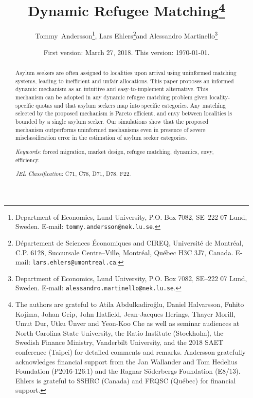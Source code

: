 \documentclass[12pt,fleqn]{article}
\begin{document}
\title{\textbf{Dynamic Refugee Matching}\footnote{The authors are grateful to Atila Abdulkadiro\u{g}lu, Daniel Halvarsson, Fuhito Kojima, Johan Grip, John Hatfield, Jean-Jacques Herings, Thayer Morill, Umut Dur, Utku \"{U}nver and Yeon-Koo Che as well as seminar audiences at North Carolina State University, the Ratio Institute (Stockholm), the Swedish Finance Ministry, Vanderbilt University, and the 2018 SAET conference (Taipei) for detailed comments and remarks. Andersson gratefully acknowledges financial support from the Jan Wallander and Tom Hedelius Foundation (P2016-126:1) and the Ragnar S\"oderbergs Foundation (E8/13). Ehlers is grateful to SSHRC (Canada) and FRQSC (Qu\'{e}bec) for financial support.}}

\author{Tommy~Andersson\footnote{Department of Economics, Lund University, P.O. Box 7082, SE--222 07 Lund, Sweden. E-mail: \texttt{tommy.andersson@nek.lu.se}.}, Lars Ehlers\footnote{D\'epartement de Sciences \'Economiques and CIREQ, Universit\'e de Montr\'eal, C.P. 6128, Succursale Centre--Ville, Montr\'eal, Qu\'ebec H3C
3J7, Canada. E-mail: \texttt{lars.ehlers@umontreal.ca}.}\space\space and Alessandro Martinello\footnote{Department of Economics, Lund University, P.O. Box 7082, SE--222 07 Lund, Sweden. E-mail: \texttt{alessandro.martinello@nek.lu.se}.}}

\date{\small{First version: March 27, 2018. This version: \today.}}

\maketitle
\vspace*{-4mm}
\begin{abstract}
\noindent Asylum seekers are often assigned to localities upon arrival using uninformed matching systems, leading to inefficient and unfair allocations. This paper proposes an informed dynamic mechanism as an intuitive and easy-to-implement alternative. This mechanism can be adopted in any dynamic refugee matching problem given locality-specific quotas and that asylum seekers map into specific categories. Any matching selected by the proposed mechanism is Pareto efficient, and envy between localities is bounded by a single asylum seeker. Our simulations show that the proposed mechanism outperforms uninformed mechanisms even in presence of severe misclassification error in the estimation of asylum seeker categories.

\medskip

\noindent\emph{Keywords}: forced migration, market design, refugee matching, dynamics, envy, efficiency.

\medskip

\noindent\emph{JEL Classification}: C71, C78, D71, D78, F22.

\end{abstract}
\end{document}
